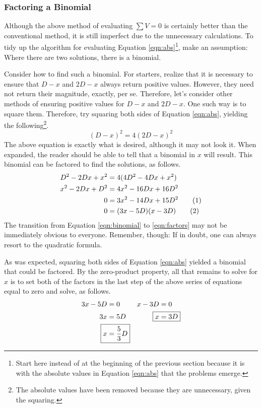 \documentclass[titlepage]{article}
\begin{document}
\subsubsection*{Factoring a Binomial}
Although the above method of evaluating $\sum V = 0$ is certainly better than the conventional method, it is still imperfect due to the unnecessary calculations. To tidy up the algorithm for evaluating Equation \ref{eqn:abs}\footnote{Start here instead of at the beginning of the previous section because it is with the absolute values in Equation \ref{eqn:abs} that the problems emerge.}, make an assumption: Where there are two solutions, there is a binomial.\par
Consider how to find such a binomial. For starters, realize that it is necessary to ensure that $D-x$ and $2D-x$ always return positive values. However, they need not return their magnitude, exactly, per se. Therefore, let's consider other methods of ensuring positive values for $D-x$ and $2D-x$. One such way is to square them. Therefore, try squaring both sides of Equation \ref{eqn:abs}, yielding the following\footnote{The absolute values have been removed because they are unnecessary, given the squaring.}.
\begin{equation*}
    (D-x)^2=4(2D-x)^2
\end{equation*}
The above equation is exactly what is desired, although it may not look it. When expanded, the reader should be able to tell that a binomial in $x$ will result. This binomial can be factored to find the solutions, as follows.
\begin{align*}
    D^2-2Dx+x^2 &= 4(4D^2-4Dx+x^2)\\
    x^2-2Dx+D^2 &= 4x^2-16Dx+16D^2\\
    0 &= 3x^2-14Dx+15D^2\stepcounter{equation}\tag{\theequation}\label{eqn:binomial}\\
    0 &= (3x-5D)(x-3D)\stepcounter{equation}\tag{\theequation}\label{eqn:factors}
\end{align*}
The transition from Equation \ref{eqn:binomial} to \ref{eqn:factors} may not be immediately obvious to everyone. Remember, though: If in doubt, one can always resort to the quadratic formula.\par
As was expected, squaring both sides of Equation \ref{eqn:abs} yielded a binomial that could be factored. By the zero-product property, all that remains to solve for $x$ is to set both of the factors in the last step of the above series of equations equal to zero and solve, as follows.
\begin{align*}
    3x-5D &= 0&
        x-3D &= 0\\
    3x &= 5D&
        \Aboxed{x &= 3D}\\
    \Aboxed{x &= \frac{5}{3}D}
\end{align*}
\end{document}
